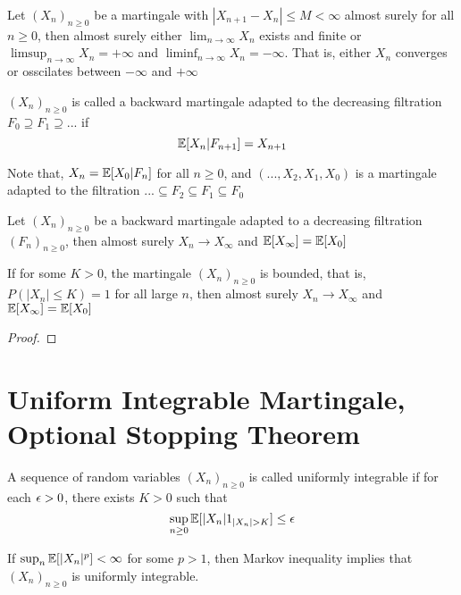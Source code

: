\documentclass{report}
\begin{document}
\begin{corollary}
	Let $(X_n)_{n \geq 0}$ be a martingale with $|X_{n+1} - X_n| \leq M < \infty$ almost surely for all $n \geq 0$, then almost surely either $\lim_{n \to \infty} X_n$ exists and finite or $\limsup_{n \to \infty} X_n = +\infty$ and $\liminf_{n \to \infty} X_n = - \infty$. That is, either $X_n$ converges or osscilates between $-\infty$ and $+\infty$ 
\end{corollary}

\begin{definition}
	$(X_n)_{n \geq 0}$ is called a backward martingale adapted to the decreasing filtration $F_0 \supseteq F_1 \supseteq ...$ if 
	$$
		\mathbb{E}[X_n | F_{n+1}] = X_{n+1}
	$$
	
	Note that, $X_n = \mathbb{E}[X_0 | F_n]$ for all $n \geq 0$, and $(..., X_2, X_1, X_0)$ is a martingale adapted to the filtration $... \subseteq F_2 \subseteq F_1 \subseteq F_0$
\end{definition}

\begin{theorem}
	Let $(X_n)_{n \geq 0}$ be a backward martingale adapted to a decreasing filtration $(F_n)_{n \geq 0}$, then almost surely $X_n \to X_\infty$ and $\mathbb{E}[X_\infty] = \mathbb{E}[X_0]$
\end{theorem}

\begin{lemma}
	If for some $K > 0$, the martingale $(X_n)_{n \geq 0}$ is bounded, that is, $P(|X_n| \leq K) = 1$ for all large $n$, then almost surely $X_n \to X_\infty$ and $\mathbb{E}[X_\infty] = \mathbb{E}[X_0]$
\begin{proof}
\end{proof}
\end{lemma}

\section{Uniform Integrable Martingale, Optional Stopping Theorem}

\begin{definition}
	A sequence of random variables $(X_n)_{n \geq 0}$ is called uniformly integrable if for each $\epsilon > 0$, there exists $K > 0$ such that
	$$
		\sup_{n \geq 0} \mathbb{E}[|X_n| 1_{|X_n| > K}] \leq \epsilon
	$$
\end{definition}

\begin{remark}
	If $\sup_{n} \mathbb{E}[|X_n|^p] < \infty$ for some $p > 1$, then Markov inequality implies that $(X_n)_{n \geq 0}$ is uniformly integrable.
\end{remark}
\end{document}
